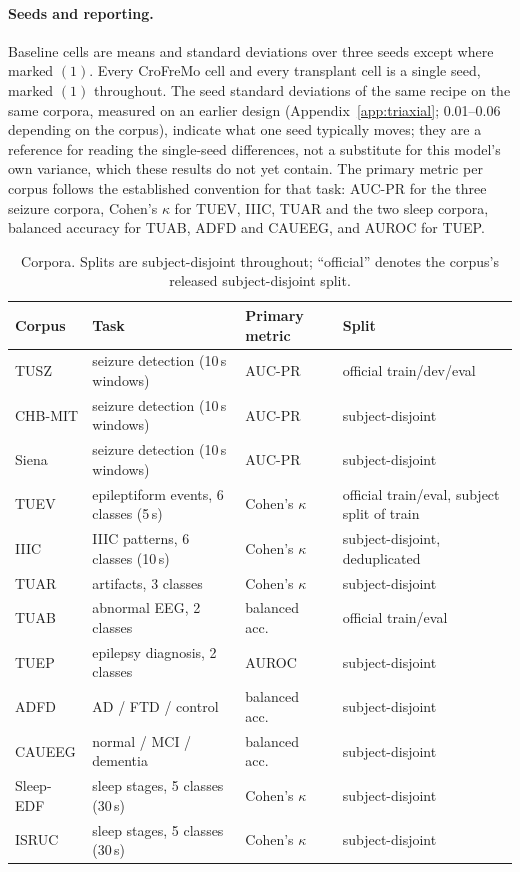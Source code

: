 \paragraph{Seeds and reporting.}
Baseline cells are means and standard deviations over three seeds except
where marked $(1)$. Every CroFreMo cell and every transplant cell is a
single seed, marked $(1)$ throughout. The seed standard deviations of the
same recipe on the same corpora, measured on an earlier design
(Appendix~\ref{app:triaxial}; 0.01--0.06 depending on the corpus),
indicate what one seed typically moves; they are a reference for reading
the single-seed differences, not a substitute for this model's own
variance, which these results do not yet contain. The primary metric per corpus
follows the established convention for that task: AUC-PR for the three
seizure corpora, Cohen's $\kappa$ for TUEV, IIIC, TUAR and the two sleep
corpora, balanced accuracy for TUAB, ADFD and CAUEEG, and AUROC for TUEP.

\begin{table}[t]
\centering
\small
\caption{Corpora. Splits are subject-disjoint throughout; ``official''
denotes the corpus's released subject-disjoint split.}
\label{tab:corpora}
\begin{tabular}{llll}
\toprule
Corpus & Task & Primary metric & Split \\
\midrule
TUSZ & seizure detection (10\,s windows) & AUC-PR & official train/dev/eval \\
CHB-MIT & seizure detection (10\,s windows) & AUC-PR & subject-disjoint \\
Siena & seizure detection (10\,s windows) & AUC-PR & subject-disjoint \\
TUEV & epileptiform events, 6 classes (5\,s) & Cohen's $\kappa$ & official train/eval, subject split of train \\
IIIC & IIIC patterns, 6 classes (10\,s) & Cohen's $\kappa$ & subject-disjoint, deduplicated \\
TUAR & artifacts, 3 classes & Cohen's $\kappa$ & subject-disjoint \\
TUAB & abnormal EEG, 2 classes & balanced acc.\ & official train/eval \\
TUEP & epilepsy diagnosis, 2 classes & AUROC & subject-disjoint \\
ADFD & AD / FTD / control & balanced acc.\ & subject-disjoint \\
CAUEEG & normal / MCI / dementia & balanced acc.\ & subject-disjoint \\
Sleep-EDF & sleep stages, 5 classes (30\,s) & Cohen's $\kappa$ & subject-disjoint \\
ISRUC & sleep stages, 5 classes (30\,s) & Cohen's $\kappa$ & subject-disjoint \\
\bottomrule
\end{tabular}
\end{table}
